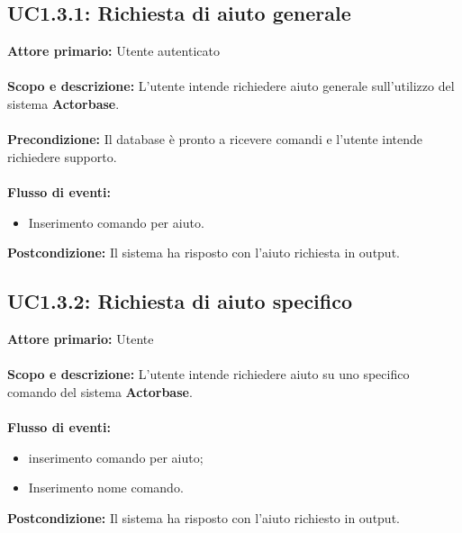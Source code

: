 \documentclass{scalatekids-article}
\begin{document}
\subsection{UC1.3.1: Richiesta di aiuto generale}
\textbf{Attore primario:} Utente autenticato\\ \\
\textbf{Scopo e descrizione:} L'utente intende richiedere aiuto generale sull'utilizzo del sistema \textbf{Actorbase}.\\ \\
\textbf{Precondizione:} Il database è pronto a ricevere comandi e l'utente intende richiedere supporto.\\ \\
\textbf{Flusso di eventi:}
\begin{itemize}
\item Inserimento comando per aiuto.
\end{itemize}
\textbf{Postcondizione:} Il sistema ha risposto con l'aiuto richiesta in output.
\subsection{UC1.3.2: Richiesta di aiuto specifico}
\textbf{Attore primario:} Utente\\ \\
\textbf{Scopo e descrizione:} L'utente intende richiedere aiuto su uno specifico comando del sistema \textbf{Actorbase}.\\ \\
\textbf{Flusso di eventi:}
\begin{itemize}
\item inserimento comando per aiuto;
\item Inserimento nome comando.
\end{itemize}
\textbf{Postcondizione:} Il sistema ha risposto con l'aiuto richiesto in output.
\end{document}
